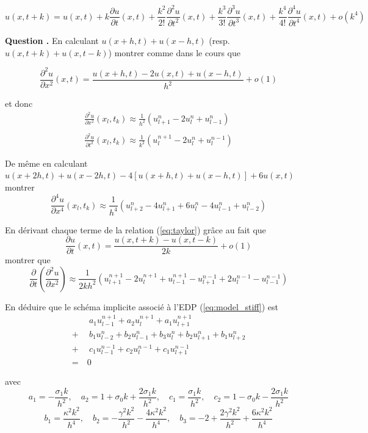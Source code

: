 \documentclass[a4,12pt]{article}
\newcounter{Nbquestion}
\newcommand*\question{%
\stepcounter{Nbquestion}%
\textbf{Question \theNbquestion. }}
\begin{document}
\[
u(x,t+k)=u(x,t)+k\frac{\partial u}{\partial t}(x,t)+\frac{k^2}{2!}\frac{\partial^2 u}{\partial t^2}(x,t)+\frac{k^3}{3!}\frac{\partial^3 u}{\partial t^3}(x,t)+\frac{k^4}{4!}\frac{\partial^4 u}{\partial t^4}(x,t)+o(k^4)
\]


\begin{mdframed}[style=exampledefault]
\question En calculant $u(x+h,t)+u(x-h,t)$ (resp. $u(x,t+k)+u(x,t-k)$) montrer comme dans le cours que 

\begin{equation}
	\frac{\partial^2 u}{\partial x^2}(x,t)=\frac{u(x+h,t)-2u(x,t)+u(x-h,t)}{h^2}+o(1)
	\label{eq:taylor}
\end{equation}
 
et donc
\[
\begin{array}{l}
	\displaystyle \frac{\partial^2 u}{\partial x^2}(x_l,t_k)\approx \frac{1}{h^2}(u_{l+1}^n-2u_l^n+u_{l-1}^n)\\ \\ 		\displaystyle \frac{\partial^2 u}{\partial t^2}(x_l,t_k)\approx \frac{1}{k^2}(u_{l}^{n+1}-2u_l^n+u_{l}^{n-1})\end{array}
\]
 
De même en calculant $u(x+2h,t)+u(x-2h,t)-4[u(x+h,t)+u(x-h,t)]+6u(x,t)$ montrer 
\[
\frac{\partial^4 u}{\partial x^4}(x_l,t_k)\approx \frac{1}{h^4}(u_{l+2}^n-4u_{l+1}^n+6u_l^n-4u_{l-1}^n+u_{l-2}^n)
\]
 
En dérivant chaque terme de la relation (\ref{eq:taylor}) grâce au fait que 
\[
\frac{\partial u}{\partial t}(x,t)=\frac{u(x,t+k)-u(x,t-k)}{2k}+o(1)
\]
montrer que 
\[
\frac{\partial}{\partial t}\left(\frac{\partial^2 u}{\partial x^2}\right)\approx \frac{1}{2kh^2}(u_{l+1}^{n+1}-2u_{l}^{n+1}+u_{l-1}^{n+1}-u_{l+1}^{n-1}+2u_l^{n-1}-u_{l-1}^{n-1})
\]
 
En déduire que le schéma implicite associé à l'EDP (\ref{eq:model_stiff}) est 
\begin{align}
	&~~a_1u_{l-1}^{n+1}+a_2u_l^{n+1}+a_1u_{l+1}^{n+1}\\
	+& ~~b_1u_{l-2}^n+b_2u_{l-1}^n+b_3u_l^n+b_2u_{l+1}^n+b_1u_{l+2}^n\\ 
	+&~~ c_1u_{l-1}^{n-1}+c_2u_l^{n-1}+c_1u_{l+1}^{n-1}\\ 
	=&~0
\end{align}

avec 
\[ 
a_1=-\frac{\sigma_1 k}{h^2},\quad a_2=1+\sigma_0 k+\frac{2\sigma_1 k}{h^2}, 
\quad c_1=\frac{\sigma_1 k}{h^2},\quad c_2=1-\sigma_0 k-\frac{2\sigma_1 k}{h^2}
\]
\[
b_1=\frac{\kappa^2 k^2}{h^4}, \quad b_2=-\frac{\gamma^2 k^2}{h^2}-\frac{4\kappa^2 k^2}{h^4},
\quad b_3=-2+\frac{2\gamma^2 k^2}{h^2}+\frac{6\kappa^2 k^2}{h^4}
\]
\end{mdframed}
\end{document}
